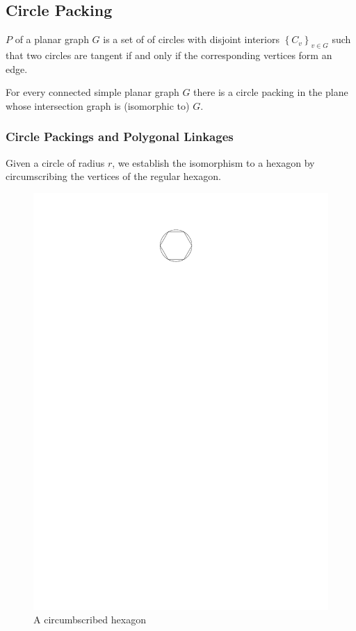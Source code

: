 

\subsection{Circle Packing}
\begin{definition}\label{def:circlePacking}
$P$ of a planar graph $G$ is a set of of circles with disjoint
interiors $\left\lbrace C_v \right\rbrace_{v \in G} $ such that two
circles are tangent if and only if the corresponding vertices form an edge.
\cite{arXiv13113363v1}
\end{definition} 


\begin{thm}\label{thm2-1}
For every connected simple planar graph $G$ there is a circle packing in the
plane whose intersection graph is (isomorphic to) $G$.
\cite{stephenson2005introduction}
\end{thm}
\subsubsection{Circle Packings and Polygonal Linkages}
Given a circle of radius $r$, we establish the isomorphism to a hexagon by
circumscribing the vertices of the regular hexagon.
\begin{figure}[h]
\begin{center}
\includegraphics{../graphics/circumscribedHexagon.pdf}
\caption{A circumbscribed hexagon}
\end{center}
\end{figure}
